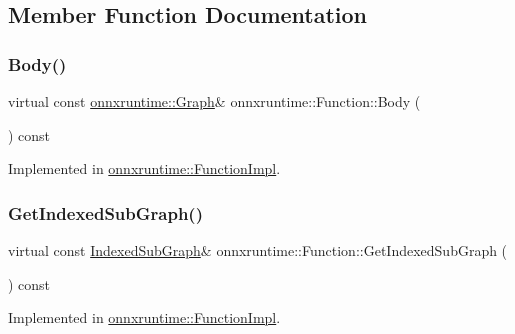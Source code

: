 \subsection{Member Function Documentation}
\mbox{\label{classonnxruntime_1_1Function_a08b5712ccba430871c186da1c8670257}} 
\subsubsection{\texorpdfstring{Body()}{Body()}}
{\footnotesize\ttfamily virtual const \mbox{\hyperlink{classonnxruntime_1_1Graph}{onnxruntime\+::\+Graph}}\& onnxruntime\+::\+Function\+::\+Body (\begin{DoxyParamCaption}{ }\end{DoxyParamCaption}) const\hspace{0.3cm}{\ttfamily [pure virtual]}}



Implemented in \mbox{\hyperlink{classonnxruntime_1_1FunctionImpl_a151af57e5850f431b6aedba554153305}{onnxruntime\+::\+Function\+Impl}}.

\mbox{\label{classonnxruntime_1_1Function_a017f5155e74c32b1e3cd42e6c0f94d91}} 
\subsubsection{\texorpdfstring{Get\+Indexed\+Sub\+Graph()}{GetIndexedSubGraph()}}
{\footnotesize\ttfamily virtual const \mbox{\hyperlink{structonnxruntime_1_1IndexedSubGraph}{Indexed\+Sub\+Graph}}\& onnxruntime\+::\+Function\+::\+Get\+Indexed\+Sub\+Graph (\begin{DoxyParamCaption}{ }\end{DoxyParamCaption}) const\hspace{0.3cm}{\ttfamily [pure virtual]}}



Implemented in \mbox{\hyperlink{classonnxruntime_1_1FunctionImpl_a97e5a25ac521423dbe59501f6b7fd2c1}{onnxruntime\+::\+Function\+Impl}}.

